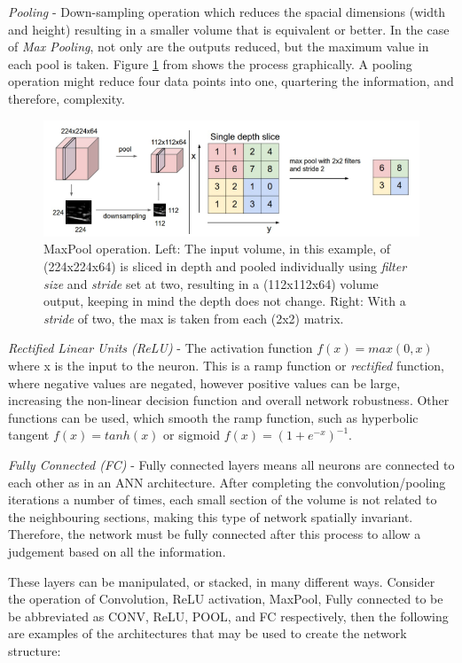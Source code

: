 \documentclass[fleqn,twoside,12pt]{report}
\begin{document}
\textit{Pooling} - Down-sampling operation which reduces the spacial dimensions (width and height) resulting in a smaller volume that is equivalent or better. In the case of \textit{Max Pooling}, not only are the outputs reduced, but the maximum value in each pool is taken. Figure \ref{fig:maxpool} from \cite{andrej}shows the process graphically. A pooling operation might reduce four data points into one, quartering the information, and therefore, complexity.

\begin{figure}[h]
	\centering
	\includegraphics[width=\textwidth]{maxpool.png}
	\caption{MaxPool operation. Left: The input volume, in this example, of (224x224x64) is sliced in depth and pooled individually using \textit{filter size} and \textit{stride} set at two, resulting in a (112x112x64) volume output, keeping in mind the depth does not change. Right: With a \textit{stride} of two, the max is taken from each (2x2) matrix.}
	\label{fig:maxpool}
\end{figure}

\textit{Rectified Linear Units (ReLU)} - The activation function $f(x) = max(0, x)$ where x is the input to the neuron. This is a ramp function or \textit{rectified} function, where negative values are negated, however positive values can be large, increasing the non-linear decision function and overall network robustness. Other functions can be used, which smooth the ramp function, such as hyperbolic tangent $f(x) = tanh(x)$ or sigmoid $f(x) = (1+e^{-x})^{-1}$.

\textit{Fully Connected (FC)} - Fully connected layers means all neurons are connected to each other as in an ANN architecture. After completing the  convolution/pooling iterations a number of times, each small section of the volume is not related to the neighbouring sections, making this type of network spatially invariant. Therefore, the network must be fully connected after this process to allow a judgement based on all the information.

These layers can be manipulated, or stacked, in many different ways. Consider the operation of Convolution, ReLU activation, MaxPool, Fully connected to be be abbreviated as CONV, ReLU, POOL, and FC respectively, then the following are examples of the architectures that may be used to create the network structure:
\end{document}
